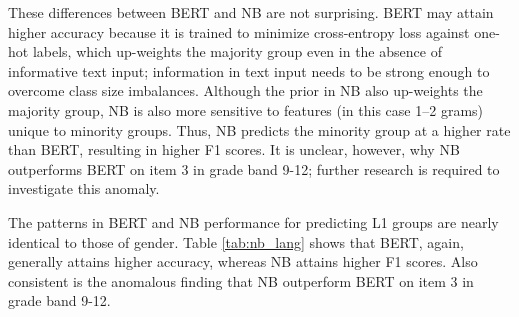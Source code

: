 \documentclass [PhD] {uclathes}
\begin{document}
These differences between BERT and NB are not surprising. BERT may attain higher accuracy because it is trained to minimize cross-entropy loss against one-hot labels, which up-weights the majority group even in the absence of informative text input; information in text input needs to be strong enough to overcome class size imbalances. Although the prior in NB also up-weights the majority group, NB is also more sensitive to features (in this case 1–2 grams) unique to minority groups. Thus, NB predicts the minority group at a higher rate than BERT, resulting in higher F1 scores. It is unclear, however, why NB outperforms BERT on item 3 in grade band 9-12; further research is required to investigate this anomaly. 

The patterns in BERT and NB performance for predicting L1 groups are nearly identical to those of gender. Table \ref{tab:nb_lang} shows that BERT, again, generally attains higher accuracy, whereas NB attains higher F1 scores. Also consistent is the anomalous finding that NB outperform BERT on item 3 in grade band 9-12. 
\end{document}
